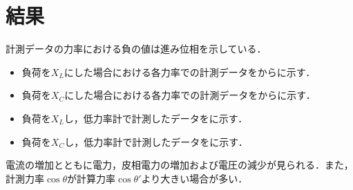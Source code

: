 \clearpage
\section{結果}
計測データの力率における負の値は進み位相を示している．
\begin{itemize}
	\item 負荷を$X_{L}$にした場合における各力率での計測データをからに示す．
	\item 負荷を$X_{C}$にした場合における各力率での計測データをからに示す．
	\item 負荷を$X_{L}$し，低力率計で計測したデータをに示す．
	\item 負荷を$X_{C}$し，低力率計で計測したデータをに示す．
\end{itemize}
	電流の増加とともに電力，皮相電力の増加および電圧の減少が見られる．また，計測力率$\cos \theta$が計算力率$\cos \theta '$より大きい場合が多い．
